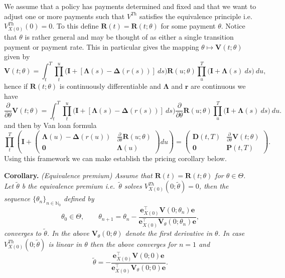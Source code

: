 \documentclass[
]{book}
\begin{document}
We assume that a policy has payments determined and fixed and that we want to adjust one or more payments such that \(V^{Th}\) satisfies the equivalence principle i.e.~\(V_{X(0)}^{Th}(0)=0\). To this define \(\mathbf R(t)=\mathbf R(t;\theta)\) for some payment \(\theta\). Notice that \(\theta\) is rather general and may be thought of as either a single transition payment or payment rate. This in particular gives the mapping \(\theta \mapsto \mathbf V(t;\theta)\) given by
\[
\mathbf V(t;\theta) = \int_t^T\prod_t^u\Big(\mathbf I +[\mathbf\Lambda(s)-\mathbf\Delta(r(s))]\ ds\Big)\mathbf R(u;\theta)\prod_u^T\Big(\mathbf I +\mathbf \Lambda(s)\ ds\Big)\ du,
\]
hence if \(\mathbf R(t;\theta)\) is continuously differentiable and \(\mathbf \Lambda\) and \(\mathbf r\) are continuous we have
\[
\frac{\partial}{\partial \theta}\mathbf V(t;\theta) = \int_t^T\prod_t^u\Big(\mathbf I +[\mathbf\Lambda(s)-\mathbf\Delta(r(s))]\ ds\Big)\frac{\partial}{\partial \theta}\mathbf R(u;\theta)\prod_u^T\Big(\mathbf I +\mathbf \Lambda(s)\ ds\Big)\ du.
\]
and then by Van loan formula
\[
\prod_t^T\left(\mathbf I+
\begin{pmatrix}
\mathbf \Lambda(u)-\mathbf \Delta(r(u)) & \frac{\partial}{\partial \theta}\mathbf R(u;\theta)\\
\mathbf 0 & \mathbf \Lambda(u)
\end{pmatrix}du
\right)=
\begin{pmatrix}
\mathbf D(t,T) & \frac{\partial}{\partial \theta}\mathbf V(t;\theta)\\
\mathbf 0 & \mathbf P(t,T)
\end{pmatrix}.
\]
Using this framework we can make establish the pricing corollary below.

\textbf{Corollary.} \emph{(Equivalence premium) Assume that \(\mathbf R(t)=\mathbf R(t;\theta)\) for \(\theta\in\Theta\). Let \(\tilde\theta\) b the equivalence premium i.e.~\(\tilde \theta\) solves \(V^{Th}_{X(0)}(0;\tilde\theta)=0\), then the sequence \(\{\theta_n\}_{n\in \mathbb N_0}\) defined by}
\[
\theta_0\in\Theta,\qquad \theta_{n+1}=\theta_{n}-\frac{\mathbf e_{X(0)}^\top\mathbf V(0;\theta_n)\mathbf e}{\mathbf e_{X(0)}^\top\mathbf V_\theta(0;\theta_n)\mathbf e},
\]
\emph{converges to \(\tilde\theta\). In the above \(\mathbf V_\theta(0;\theta)\) denote the first derivative in \(\theta\). In case \(V^{Th}_{X(0)}(0;\tilde\theta)\) is linear in \(\theta\) then the above converges for \(n=1\) and}
\[
\tilde\theta = -\frac{\mathbf e_{X(0)}^\top\mathbf V(0;0)\mathbf e}{\mathbf e_{X(0)}^\top\mathbf V_\theta(0;0)\mathbf e}.
\]
\end{document}
